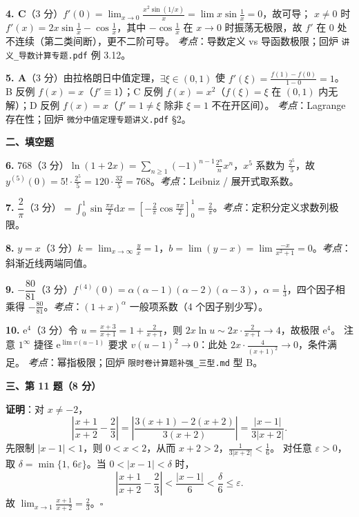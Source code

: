 \documentclass[11pt,a4paper]{ctexart}
\newcommand{\ee}{\mathrm{e}}
\newcommand{\D}{\mathrm{d}}
\begin{document}
\textbf{4. C}（3 分）$f'(0)=\lim_{x\to0}\frac{x^2\sin(1/x)}x=\lim x\sin\frac1x=0$，故可导；
$x\ne0$ 时 $f'(x)=2x\sin\frac1x-\cos\frac1x$，其中 $-\cos\frac1x$ 在 $x\to0$ 时振荡无极限，故 $f'$ 在 0 处不连续（第二类间断），更不二阶可导。
\textit{考点}：导数定义 vs 导函数极限；回炉 \texttt{讲义\_导数计算专题.pdf} 例 3.12。

\textbf{5. A}（3 分）由拉格朗日中值定理，$\exists\xi\in(0,1)$ 使 $f'(\xi)=\frac{f(1)-f(0)}{1-0}=1$。
B 反例 $f(x)=x$（$f'\equiv1$）；C 反例 $f(x)=x^2$（$f(\xi)=\xi$ 在 $(0,1)$ 内无解）；D 反例 $f(x)=x$（$f'=1\ne\xi$ 除非 $\xi=1$ 不在开区间）。
\textit{考点}：Lagrange 存在性；回炉 \texttt{微分中值定理专题讲义.pdf} §2。

\bigskip
\noindent\textbf{二、填空题}

\textbf{6.} $768$（3 分）$\ln(1+2x)=\sum_{n\ge1}(-1)^{n-1}\frac{2^n}{n}x^n$，$x^5$ 系数为 $\frac{2^5}{5}$，故 $y^{(5)}(0)=5!\cdot\frac{2^5}{5}=120\cdot\frac{32}{5}=768$。\quad\textit{考点}：Leibniz / 展开式取系数。

\textbf{7.} $\dfrac2\pi$（3 分）$=\int_0^1\sin\frac{\pi x}2\D x=\left[-\frac2\pi\cos\frac{\pi x}2\right]_0^1=\frac2\pi$。\quad\textit{考点}：定积分定义求数列极限。

\textbf{8.} $y=x$（3 分）$k=\lim_{x\to\infty}\frac{y}{x}=1$，$b=\lim(y-x)=\lim\frac{-x}{x^2+1}=0$。\quad\textit{考点}：斜渐近线两端同值。

\textbf{9.} $-\dfrac{80}{81}$（3 分）$f^{(4)}(0)=\alpha(\alpha-1)(\alpha-2)(\alpha-3)$，$\alpha=\frac13$，四个因子相乘得 $-\frac{80}{81}$。\quad\textit{考点}：$(1+x)^\alpha$ 一般项系数（4 个因子别少写）。

\textbf{10.} $\ee^4$（3 分）令 $u=\frac{x+3}{x+1}=1+\frac{2}{x+1}$，则
$2x\ln u\sim2x\cdot\frac{2}{x+1}\to4$，故极限 $\ee^4$。
注意 $1^\infty$ 捷径 $\ee^{\lim v(u-1)}$ 要求 $v(u-1)^2\to0$：此处 $2x\cdot\frac{4}{(x+1)^2}\to0$，条件满足。
\quad\textit{考点}：幂指极限；回炉 \texttt{限时卷计算题补强\_三型.md} 型 B。

\bigskip
\noindent\textbf{三、第 11 题（8 分）}

\textbf{证明}：对 $x\ne-2$，
$$\left|\frac{x+1}{x+2}-\frac23\right|=\left|\frac{3(x+1)-2(x+2)}{3(x+2)}\right|=\frac{|x-1|}{3|x+2|}.$$
先限制 $|x-1|<1$，则 $0<x<2$，从而 $x+2>2$，$\frac1{3|x+2|}<\frac16$。
对任意 $\varepsilon>0$，取 $\delta=\min\{1,\,6\varepsilon\}$。当 $0<|x-1|<\delta$ 时，
$$\left|\frac{x+1}{x+2}-\frac23\right|<\frac{|x-1|}{6}<\frac{\delta}{6}\le\varepsilon.$$
故 $\lim_{x\to1}\frac{x+1}{x+2}=\frac23$。\quad$\square$
\end{document}
